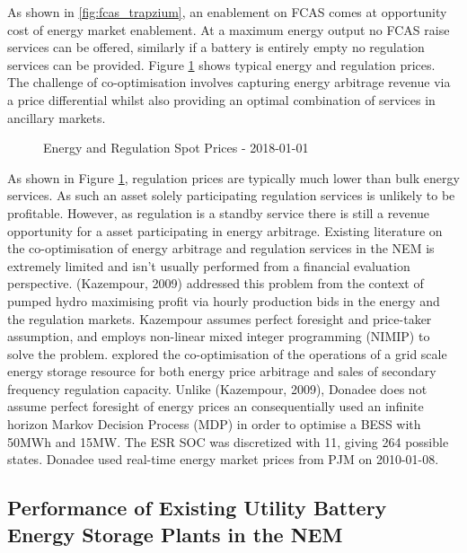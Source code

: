 As shown in \ref{fig:fcas_trapzium}, an enablement on FCAS comes at opportunity cost of energy market enablement. At a maximum energy output no FCAS raise services can be offered, similarly if a battery is entirely empty no regulation services can be provided. Figure \ref{fig:energy_and_reg} shows typical energy and regulation prices. The challenge of co-optimisation involves capturing energy arbitrage revenue via a price differential whilst also providing an optimal combination of services in ancillary markets.
\begin{figure}[H]
    \centering
    \caption{Energy and Regulation Spot Prices - 2018-01-01}
    \label{fig:energy_and_reg}
\end{figure}
As shown in Figure \ref{fig:energy_and_reg}, regulation prices are typically much lower than bulk energy services. As such an asset solely participating regulation services is unlikely to be profitable. However, as regulation is a standby service there is still a revenue opportunity for a asset participating in energy arbitrage.
\newline
\newline
Existing literature on the co-optimisation of energy arbitrage and regulation services in the NEM is extremely limited and isn't usually performed from a financial evaluation perspective. 
(Kazempour, 2009) addressed this problem from the context of pumped hydro maximising profit via hourly production bids in the energy and the regulation markets. Kazempour assumes perfect foresight and price-taker assumption, and employs non-linear mixed integer programming (NIMIP) to solve the problem. 
\newline 
\newline 
\parencite{Dondadee} explored the co-optimisation of the operations of a grid scale energy storage resource for both energy price arbitrage and sales of secondary frequency regulation capacity. Unlike (Kazempour, 2009), Donadee does not assume perfect foresight of energy prices an consequentially used an infinite horizon Markov Decision Process  (MDP) in order to optimise a BESS with 50MWh and 15MW.  The ESR SOC was discretized with 11, giving 264 possible states. Donadee used real-time energy market prices from PJM on 2010-01-08. 


\subsection{ Performance of Existing Utility Battery Energy Storage Plants in the NEM }
